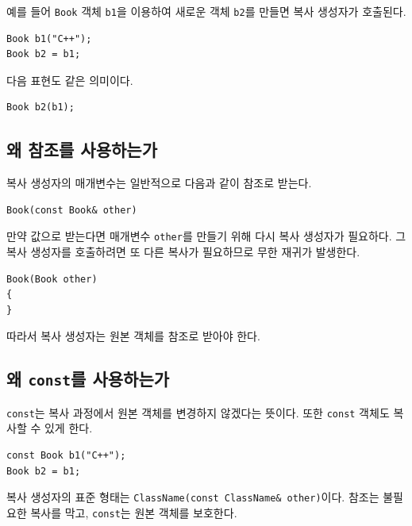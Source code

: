 \documentclass[11pt,a4paper]{article}
\begin{document}
예를 들어 \texttt{Book} 객체 \texttt{b1}을 이용하여 새로운 객체 \texttt{b2}를 만들면 복사 생성자가 호출된다.

\begin{lstlisting}
Book b1("C++");
Book b2 = b1;
\end{lstlisting}

다음 표현도 같은 의미이다.

\begin{lstlisting}
Book b2(b1);
\end{lstlisting}

\subsection{왜 참조를 사용하는가}
복사 생성자의 매개변수는 일반적으로 다음과 같이 참조로 받는다.

\begin{lstlisting}
Book(const Book& other)
\end{lstlisting}

만약 값으로 받는다면 매개변수 \texttt{other}를 만들기 위해 다시 복사 생성자가 필요하다. 그 복사 생성자를 호출하려면 또 다른 복사가 필요하므로 무한 재귀가 발생한다.

\begin{lstlisting}
Book(Book other)
{
}
\end{lstlisting}

따라서 복사 생성자는 원본 객체를 참조로 받아야 한다.

\subsection{왜 \texttt{const}를 사용하는가}
\texttt{const}는 복사 과정에서 원본 객체를 변경하지 않겠다는 뜻이다. 또한 \texttt{const} 객체도 복사할 수 있게 한다.

\begin{lstlisting}
const Book b1("C++");
Book b2 = b1;
\end{lstlisting}

\begin{importantbox}
복사 생성자의 표준 형태는 \texttt{ClassName(const ClassName\& other)}이다. 참조는 불필요한 복사를 막고, \texttt{const}는 원본 객체를 보호한다.
\end{importantbox}
\end{document}
